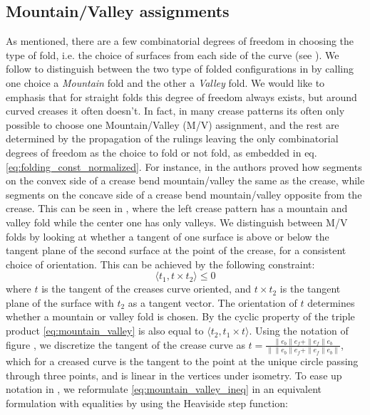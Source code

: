 \subsection{Mountain/Valley assignments} As mentioned, there are a few combinatorial degrees of freedom in choosing the type of fold, i.e. the choice of surfaces from each side of the curve (see ). We follow \cite{demaine_lens} to distinguish between the two type of folded configurations in  by calling one choice a \textit{Mountain} fold and the other a \textit{Valley} fold. We would like to emphasis that for straight folds this degree of freedom always exists, but around curved creases it often doesn't. In fact, in many crease patterns its often only possible to choose one Mountain/Valley (M/V) assignment, and the rest are determined by the propagation of the rulings leaving the only combinatorial degrees of freedom  as the choice to fold or not fold, as embedded in eq. \eqref{eq:folding_const_normalized}. For instance, in \cite{demaine_lens} the authors proved how segments on the convex side of a crease bend mountain/valley the same as the crease, while segments on the concave side of a crease bend mountain/valley opposite from the crease. This can be seen in , where the left crease pattern has a mountain and valley fold while the center one has only valleys.
  We distinguish between M/V folds by looking at whether a tangent of one surface is above or below the tangent plane of the second surface at the point of the crease, for a consistent choice of orientation. This can be achieved by the following constraint:
\begin{equation} \label{eq:mountain_valley_ineq}
\langle t_1, t \times t_2 \rangle \leq 0
\end{equation}
where $t$ is the tangent of the creases curve oriented, and $t \times t_2$ is the tangent plane of the surface with $t_2$ as a tangent vector. The orientation of $t$ determines whether a mountain or valley fold is chosen. By the cyclic property of the triple product \eqref{eq:mountain_valley} is also equal to $\langle t_2, t_1 \times t \rangle$.
Using the notation of figure , we discretize the tangent of the crease curve as $t = \frac{\|e_b\|e_f + \|e_f\|e_b}{\|\|e_b\|e_f + \|e_f\|e_b\|}$, which for a creased curve is the tangent to the point at the unique circle passing through three points, and is linear in the vertices under isometry.
To ease up notation in , we reformulate \eqref{eq:mountain_valley_ineq} in an equivalent formulation with equalities by using the Heaviside step function:
